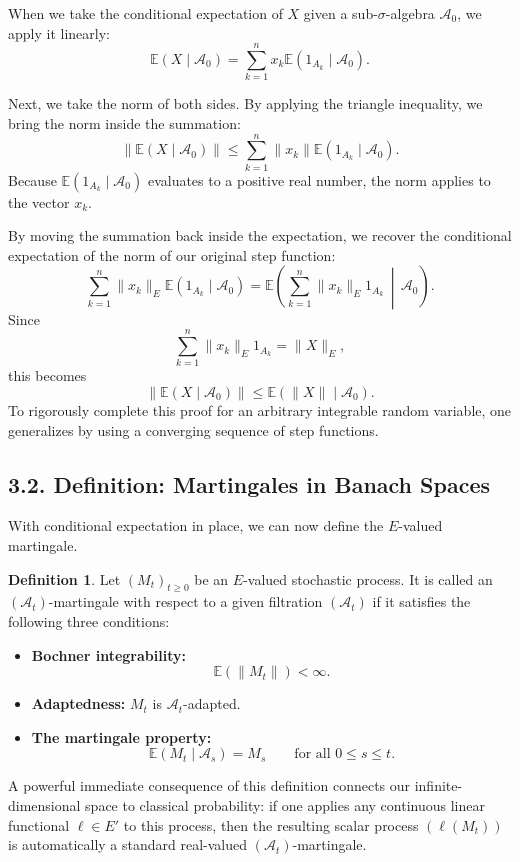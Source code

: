 \documentclass[11pt]{article}
\theoremstyle{definition}
\newtheorem{definition}{Definition}
\theoremstyle{remark}
\begin{document}
When we take the conditional expectation of \(X\) given a sub-\(\sigma\)-algebra \(\mathcal A_0\), we apply it linearly:
\[
\mathbb E(X\mid \mathcal A_0)=\sum_{k=1}^{n} x_k \mathbb E(1_{A_k}\mid \mathcal A_0).
\]

Next, we take the norm of both sides. By applying the triangle inequality, we bring the norm inside the summation:
\[
\|\mathbb E(X\mid \mathcal A_0)\|
\le
\sum_{k=1}^{n} \|x_k\| \mathbb E(1_{A_k}\mid \mathcal A_0).
\]
Because \(\mathbb E(1_{A_k}\mid \mathcal A_0)\) evaluates to a positive real number, the norm applies to the vector \(x_k\).

By moving the summation back inside the expectation, we recover the conditional expectation of the norm of our original step function:
\[
\sum_{k=1}^{n} \|x_k\|_E \mathbb E(1_{A_k}\mid \mathcal A_0)
=
\mathbb E\left(\sum_{k=1}^{n}\|x_k\|_E 1_{A_k}\,\middle|\,\mathcal A_0\right).
\]
Since
\[
\sum_{k=1}^{n}\|x_k\|_E 1_{A_k}
=
\|X\|_E,
\]
this becomes
\[
\|\mathbb E(X\mid \mathcal A_0)\|
\le
\mathbb E(\|X\|\mid \mathcal A_0).
\]
To rigorously complete this proof for an arbitrary integrable random variable, one generalizes by using a converging sequence of step functions.

\subsection*{3.2. Definition: Martingales in Banach Spaces}
With conditional expectation in place, we can now define the \(E\)-valued martingale.

\begin{definition}
Let \((M_t)_{t\ge 0}\) be an \(E\)-valued stochastic process. It is called an \((\mathcal A_t)\)-martingale with respect to a given filtration \((\mathcal A_t)\) if it satisfies the following three conditions:
\begin{itemize}
\item \textbf{Bochner integrability:}
\[
\mathbb E(\|M_t\|)<\infty.
\]
\item \textbf{Adaptedness:} \(M_t\) is \(\mathcal A_t\)-adapted.
\item \textbf{The martingale property:}
\[
\mathbb E(M_t\mid \mathcal A_s)=M_s
\qquad \text{for all } 0\le s\le t.
\]
\end{itemize}
\end{definition}

A powerful immediate consequence of this definition connects our infinite-dimensional space to classical probability: if one applies any continuous linear functional \(\ell\in E'\) to this process, then the resulting scalar process \((\ell(M_t))\) is automatically a standard real-valued \((\mathcal A_t)\)-martingale.
\end{document}
